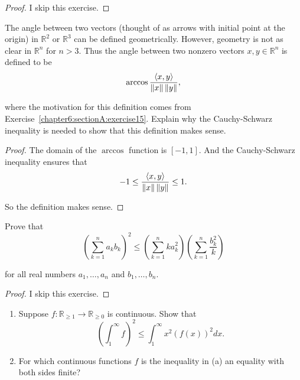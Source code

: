 \begin{proof}
    I skip this exercise.
\end{proof}
\newpage

\begin{exercise}
    The angle between two vectors (thought of as arrows with initial point at the origin) in $\mathbb{R}^{2}$ or $\mathbb{R}^{3}$ can be defined geometrically. However, geometry is not as clear in $\mathbb{R}^{n}$ for $n > 3$. Thus the angle between two nonzero vectors $x, y \in \mathbb{R}^{n}$ is defined to be
    \[
        \arccos\frac{\left\langle{x, y}\right\rangle}{\left\Vert{x}\right\Vert\left\Vert{y}\right\Vert},
    \]

    where the motivation for this definition comes from Exercise~\ref{chapter6:sectionA:exercise15}. Explain why the Cauchy-Schwarz inequality is needed to show that this definition makes sense.
\end{exercise}

\begin{proof}
    The domain of the $\arccos$ function is $[-1, 1]$. And the Cauchy-Schwarz inequality ensures that
    \[
        -1 \leq \frac{\left\langle{x, y}\right\rangle}{\left\Vert{x}\right\Vert\left\Vert{y}\right\Vert} \leq 1.
    \]

    So the definition makes sense.
\end{proof}
\newpage

\begin{exercise}
    Prove that
    \[
        {\left(\sum^{n}_{k=1}a_{k}b_{k}\right)}^{2} \leq \left(\sum^{n}_{k=1}ka_{k}^{2}\right)\left(\sum^{n}_{k=1}\frac{b_{k}^{2}}{k}\right)
    \]

    for all real numbers $a_{1}, \ldots, a_{n}$ and $b_{1}, \ldots, b_{n}$.
\end{exercise}

\begin{proof}
    I skip this exercise.
\end{proof}
\newpage

\begin{exercise}
    \begin{enumerate}[label={(\alph*)}]
        \item Suppose $f: \mathbb{R}_{\geq 1} \to \mathbb{R}_{\geq 0}$ is continuous. Show that
              \[
                  {\left(\int^{\infty}_{1}f\right)}^{2}\leq \int^{\infty}_{1}x^{2}{\left(f(x)\right)}^{2}dx.
              \]
        \item For which continuous functions $f$ is the inequality in (a) an equality with both sides finite?
    \end{enumerate}
\end{exercise}

